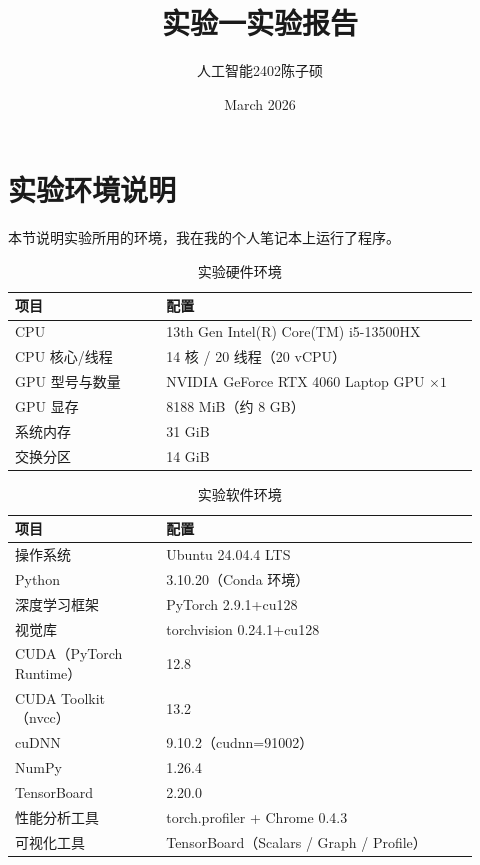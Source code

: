 \documentclass{article}
\title{实验一\hspace{2em}实验报告}
\author{人工智能2402\hspace{1em}陈子硕}
\date{March 2026}
\begin{document}
\maketitle

\section{实验环境说明}
本节说明实验所用的环境，我在我的个人笔记本上运行了程序。
\begin{table}[htbp]
\centering
\caption{实验硬件环境}
\label{tab:hardware_env}
\begin{tabular}{p{0.30\linewidth} p{0.62\linewidth}}
\toprule
项目 & 配置 \\
\midrule
CPU & 13th Gen Intel(R) Core(TM) i5-13500HX \\
CPU 核心/线程 & 14 核 / 20 线程（20 vCPU） \\
GPU 型号与数量 & NVIDIA GeForce RTX 4060 Laptop GPU $\times 1$ \\
GPU 显存 & 8188 MiB（约 8 GB） \\
系统内存 & 31 GiB \\
交换分区 & 14 GiB \\
\bottomrule
\end{tabular}
\end{table}

\begin{table}[htbp]
\centering
\caption{实验软件环境}
\label{tab:software_env}
\begin{tabular}{p{0.30\linewidth} p{0.62\linewidth}}
\toprule
项目 & 配置 \\
\midrule
操作系统 & Ubuntu 24.04.4 LTS \\
Python & 3.10.20（Conda 环境） \\
深度学习框架 & PyTorch 2.9.1+cu128 \\
视觉库 & torchvision 0.24.1+cu128 \\
CUDA（PyTorch Runtime） & 12.8 \\
CUDA Toolkit（nvcc） & 13.2 \\
cuDNN & 9.10.2（cudnn=91002） \\
NumPy & 1.26.4 \\
TensorBoard & 2.20.0 \\
性能分析工具 & torch.profiler + Chrome 0.4.3 \\
可视化工具 & TensorBoard（Scalars / Graph / Profile） \\
\bottomrule
\end{tabular}
\end{table}
\end{document}

